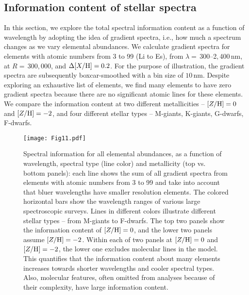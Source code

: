 \documentclass[iop]{emulateapj}
\begin{document}
\begin{CJK*}{UTF8}{gbsn}
\appendix

%
%
%
%
%
%

\section{Information content of stellar spectra}
\label{sec:information-contents}

In this section, we explore the total spectral information content as a function of wavelength by adopting the idea of gradient spectra, i.e., how much a spectrum changes as we vary elemental abundances. We calculate gradient spectra for elements with atomic numbers from 3 to 99 (Li to Es), from $\lambda = \,$300--2$,$400$\,$nm, at $R = \,$300$,$000, and $\Delta [X/{\rm H}] = 0.2$. For the purpose of illustration, the gradient spectra are subsequently boxcar-smoothed with a bin size of $10\,$nm. Despite exploring an exhaustive list of elements, we find many elements to have zero gradient spectra because there are no significant atomic lines for these elements. We compare the information content at two different metallicities -- $[Z/{\rm H}] = 0$ and $[Z/{\rm H}] = -2$, and four different stellar types -- M-giants, K-giants, G-dwarfs, F-dwarfs. 

\begin{figure*}
\centering
\texttt{[image: Fig11.pdf]}
\caption{Spectral information for all elemental abundances, as a function of wavelength, spectral type (line color) and metallicity (top vs. bottom panels): each line shows the sum of all gradient spectra from elements with atomic numbers from 3 to 99 and take into account that bluer wavelengths have smaller resolution elements. The colored horizontal bars show the wavelength ranges of various large spectroscopic surveys. Lines in different colors illustrate different stellar types -- from M-giants to F-dwarfs. The top two panels show the information content of $[Z/{\rm H}]=0$, and the lower two panels assume $[Z/{\rm H}] = -2$. Within each of two panels at $[Z/{\rm H}] = 0$ and $[Z/{\rm H}] = -2$, the lower one excludes molecular lines in the model. This quantifies that the information content about many elements increases towards shorter wavelengths and cooler spectral types. Also, molecular features, often omitted from analyses because of their complexity, have large information content.}
\label{fig:information-density-1}
\end{figure*}


\end{CJK*}
\end{document}
